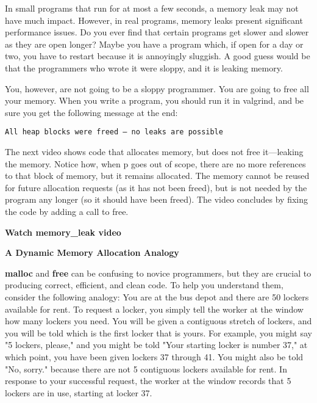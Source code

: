 \documentclass[11pt, a4paper]{article}
\begin{document}
In small programs that run for at most a few seconds, a memory leak may not have much impact. However, in real programs, memory leaks present significant performance issues. Do you ever find that certain programs get slower and slower as they are open longer? Maybe you have a program which, if open for a day or two, you have to restart because it is annoyingly sluggish. A good guess would be that the programmers who wrote it were sloppy, and it is leaking memory.



You, however, are not going to be a sloppy programmer. You are going to free all your memory. When you write a program, you should run it in valgrind, and be sure you get the following message at the end:



\texttt{All heap blocks were freed -- no leaks are possible} 



The next video shows code that allocates memory, but does not free it—leaking the memory. Notice how, when p goes out of scope, there are no more references to that block of memory, but it remains allocated. The memory cannot be reused for future allocation requests (as it has not been freed), but is not needed by the program any longer (so it should have been freed). The video concludes by fixing the code by adding a call to free.


\textbf{Watch memory\_leak video}

\textbf{A Dynamic Memory Allocation Analogy}

\textbf{malloc }and \textbf{free }can be confusing to novice programmers, but they are crucial to producing correct, efficient, and clean code. To help you understand them, consider the following analogy: You are at the bus depot and there are 50 lockers available for rent. To request a locker, you simply tell the worker at the window how many lockers you need. You will be given a contiguous stretch of lockers, and you will be told which is the first locker that is yours. For example, you might say "5 lockers, please," and you might be told "Your starting locker is number 37," at which point, you have been given lockers 37 through 41. You might also be told "No, sorry." because there are not 5 contiguous lockers available for rent. In response to your successful request, the worker at the window records that 5 lockers are in use, starting at locker 37.
\end{document}
